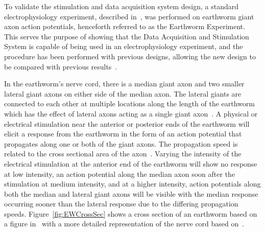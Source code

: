 
To validate the stimulation and data acquisition system design, a standard electrophysiology experiment, described in~\cite{Olivo,KuehJellies,EllingerMSEE}, was performed on earthworm giant axon action potentials, henceforth referred to as the Earthworm Experiment.  This serves the purpose of showing that the Data Acquisition and Stimulation System is capable of being used in an electrophysiology experiment, and the procedure has been performed with previous designs, allowing the new design to be compared with previous results~\cite{StahlMSEE}.


In the earthworm's nerve cord, there is a median giant axon and two smaller lateral giant axons on either side of the median axon.  The lateral giants are connected to each other at multiple locations along the length of the earthworm which has the effect of lateral axons acting as a single giant axon~\cite{Olivo}.  A physical or electrical stimulation near the anterior or posterior ends of the earthworm will elicit a response from the earthworm in the form of an action potential that propagates along one or both of the giant axons.  The propagation speed is related to the cross sectional area of the axon~\cite{KuehJellies}.  Varying the intensity of the electrical stimulation at the anterior end of the earthworm will show no response at low intensity, an action potential along the median axon soon after the stimulation at medium intensity, and at a higher intensity, action potentials along both the median and lateral giant axons will be visible with the median response occurring sooner than the lateral response due to the differing propagation speeds.  Figure~\ref{fig:EWCrossSec} shows a cross section of an earthworm based on a figure in~\cite{Kladt2010} with a more detailed representation of the nerve cord based on~\cite{KuehJellies}.

